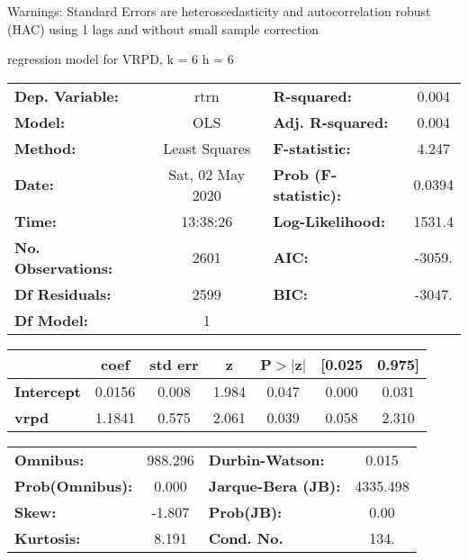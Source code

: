 Warnings: \newline
 [1] Standard Errors are heteroscedasticity and autocorrelation robust (HAC) using 1 lags and without small sample correction\ 

regression model for VRPD, k = 6 h = 6\begin{center}
\begin{tabular}{lclc}
\toprule
\textbf{Dep. Variable:}    &       rtrn       & \textbf{  R-squared:         } &     0.004   \\
\textbf{Model:}            &       OLS        & \textbf{  Adj. R-squared:    } &     0.004   \\
\textbf{Method:}           &  Least Squares   & \textbf{  F-statistic:       } &     4.247   \\
\textbf{Date:}             & Sat, 02 May 2020 & \textbf{  Prob (F-statistic):} &   0.0394    \\
\textbf{Time:}             &     13:38:26     & \textbf{  Log-Likelihood:    } &    1531.4   \\
\textbf{No. Observations:} &        2601      & \textbf{  AIC:               } &    -3059.   \\
\textbf{Df Residuals:}     &        2599      & \textbf{  BIC:               } &    -3047.   \\
\textbf{Df Model:}         &           1      & \textbf{                     } &             \\
\bottomrule
\end{tabular}
\begin{tabular}{lcccccc}
                   & \textbf{coef} & \textbf{std err} & \textbf{z} & \textbf{P$> |$z$|$} & \textbf{[0.025} & \textbf{0.975]}  \\
\midrule
\textbf{Intercept} &       0.0156  &        0.008     &     1.984  &         0.047        &        0.000    &        0.031     \\
\textbf{vrpd}      &       1.1841  &        0.575     &     2.061  &         0.039        &        0.058    &        2.310     \\
\bottomrule
\end{tabular}
\begin{tabular}{lclc}
\textbf{Omnibus:}       & 988.296 & \textbf{  Durbin-Watson:     } &    0.015  \\
\textbf{Prob(Omnibus):} &   0.000 & \textbf{  Jarque-Bera (JB):  } & 4335.498  \\
\textbf{Skew:}          &  -1.807 & \textbf{  Prob(JB):          } &     0.00  \\
\textbf{Kurtosis:}      &   8.191 & \textbf{  Cond. No.          } &     134.  \\
\bottomrule
\end{tabular}
\end{center}


